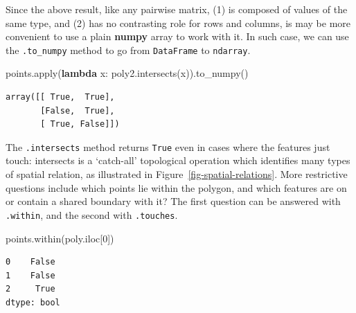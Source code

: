 \documentclass[
  letterpaper,
]{krantz}
\newenvironment{Shaded}{\begin{snugshade}}{\end{snugshade}}
\newcommand{\BuiltInTok}[1]{\textcolor[rgb]{0.00,0.23,0.31}{#1}}
\newcommand{\DecValTok}[1]{\textcolor[rgb]{0.68,0.00,0.00}{#1}}
\newcommand{\KeywordTok}[1]{\textcolor[rgb]{0.00,0.23,0.31}{\textbf{#1}}}
\newcommand{\NormalTok}[1]{\textcolor[rgb]{0.00,0.23,0.31}{#1}}
\begin{document}
\begin{tcolorbox}[enhanced jigsaw, title=\textcolor{quarto-callout-note-color}{\faInfo}\hspace{0.5em}{Note}, coltitle=black, colbacktitle=quarto-callout-note-color!10!white, breakable, titlerule=0mm, colframe=quarto-callout-note-color-frame, opacitybacktitle=0.6, colback=white, bottomrule=.15mm, left=2mm, leftrule=.75mm, toprule=.15mm, toptitle=1mm, bottomtitle=1mm, arc=.35mm, opacityback=0, rightrule=.15mm]

Since the above result, like any pairwise matrix, (1) is composed of
values of the same type, and (2) has no contrasting role for rows and
columns, is may be more convenient to use a plain \textbf{numpy} array
to work with it. In such case, we can use the \texttt{.to\_numpy} method
to go from \texttt{DataFrame} to \texttt{ndarray}.

\begin{Shaded}
\begin{Highlighting}[]
\NormalTok{points.}\BuiltInTok{apply}\NormalTok{(}\KeywordTok{lambda}\NormalTok{ x: poly2.intersects(x)).to\_numpy()}
\end{Highlighting}
\end{Shaded}

\begin{verbatim}
array([[ True,  True],
       [False,  True],
       [ True, False]])
\end{verbatim}

\end{tcolorbox}

The \texttt{.intersects} method returns \texttt{True} even in cases
where the features just touch: intersects is a `catch-all' topological
operation which identifies many types of spatial relation, as
illustrated in Figure~\ref{fig-spatial-relations}. More restrictive
questions include which points lie within the polygon, and which
features are on or contain a shared boundary with it? The first question
can be answered with \texttt{.within}, and the second with
\texttt{.touches}.

\begin{Shaded}
\begin{Highlighting}[]
\NormalTok{points.within(poly.iloc[}\DecValTok{0}\NormalTok{])}
\end{Highlighting}
\end{Shaded}

\begin{verbatim}
0    False
1    False
2     True
dtype: bool
\end{verbatim}
\end{document}
